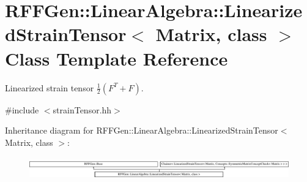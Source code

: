 \hypertarget{classRFFGen_1_1LinearAlgebra_1_1LinearizedStrainTensor}{\section{R\-F\-F\-Gen\-:\-:Linear\-Algebra\-:\-:Linearized\-Strain\-Tensor$<$ Matrix, class $>$ Class Template Reference}
\label{classRFFGen_1_1LinearAlgebra_1_1LinearizedStrainTensor}
}


Linearized strain tensor $ \frac{1}{2}\left(F^T+F\right) $.  




{\ttfamily \#include $<$strain\-Tensor.\-hh$>$}

Inheritance diagram for R\-F\-F\-Gen\-:\-:Linear\-Algebra\-:\-:Linearized\-Strain\-Tensor$<$ Matrix, class $>$\-:\begin{figure}[H]
\begin{center}
\leavevmode
\includegraphics[height=0.962199cm]{classRFFGen_1_1LinearAlgebra_1_1LinearizedStrainTensor}
\end{center}
\end{figure}
